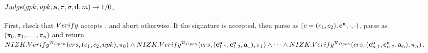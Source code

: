 \paragraph{$Judge(gpk,upk,\mathbf{a},\pi,\sigma,\mathbf{d},m)
  \rightarrow 1/0$.} %
First, check that $Verify$ accepts \sig, and abort otherwise. If the signature
is accepted, then parse \sig as $(c=(c_1,c_2),\mathbf{c}^{\mathbf{a}},\cdot,\cdot)$,
parse \oproof as $(\pi_0,\pi_1,\dots,\pi_n)$ and
return $NIZK.Verify^{\mathcal{R}_{Open}}(crs,(c_1,c_2,upk),\pi_0) \land
NIZK.Verify^{\mathcal{R}_{Open}}(crs,(\mathbf{c}^{\mathbf{a}}_{1,1},\mathbf{c}^{\mathbf{a}}_{1,2},\mathbf{a}_1),\pi_1) \land
\dots \land
NIZK.Verify^{\mathcal{R}_{Open}}(crs,(\mathbf{c}^{\mathbf{a}}_{n,1},\mathbf{c}^{\mathbf{a}}_{n,2},\mathbf{a}_n),\pi_n)$.


